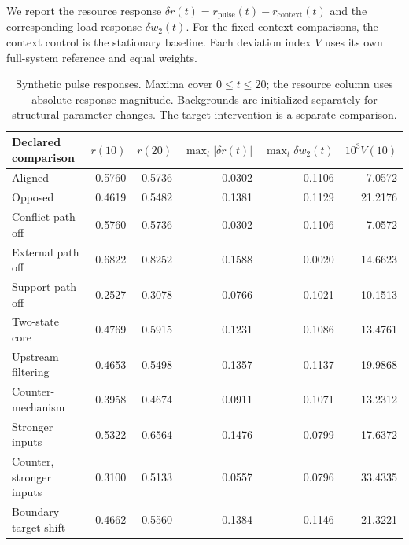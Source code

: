 We report the resource response $\delta r(t)=r_{\mathrm{pulse}}(t)-r_{\mathrm{context}}(t)$ and the corresponding load response $\delta w_2(t)$. For the fixed-context comparisons, the context control is the stationary baseline. Each deviation index $V$ uses its own full-system reference and equal weights.

\begin{table}[H]\centering\footnotesize

\begin{tabularx}{\textwidth}{@{}Yrrrrr@{}}\toprule

Declared comparison & $r(10)$ & $r(20)$ & $\max_t|\delta r(t)|$ & $\max_t\delta w_2(t)$ & $10^3 V(10)$ \\\midrule

Aligned & 0.5760 & 0.5736 & 0.0302 & 0.1106 & 7.0572 \\

Opposed & 0.4619 & 0.5482 & 0.1381 & 0.1129 & 21.2176 \\

Conflict path off & 0.5760 & 0.5736 & 0.0302 & 0.1106 & 7.0572 \\

External path off & 0.6822 & 0.8252 & 0.1588 & 0.0020 & 14.6623 \\

Support path off & 0.2527 & 0.3078 & 0.0766 & 0.1021 & 10.1513 \\

Two-state core & 0.4769 & 0.5915 & 0.1231 & 0.1086 & 13.4761 \\

Upstream filtering & 0.4653 & 0.5498 & 0.1357 & 0.1137 & 19.9868 \\

Counter-mechanism & 0.3958 & 0.4674 & 0.0911 & 0.1071 & 13.2312 \\

Stronger inputs & 0.5322 & 0.6564 & 0.1476 & 0.0799 & 17.6372 \\

Counter, stronger inputs & 0.3100 & 0.5133 & 0.0557 & 0.0796 & 33.4335 \\

Boundary target shift & 0.4662 & 0.5560 & 0.1384 & 0.1146 & 21.3221 \\

\bottomrule\end{tabularx}

\caption{Synthetic pulse responses. Maxima cover $0\leq t\leq20$; the resource column uses absolute response magnitude. Backgrounds are initialized separately for structural parameter changes. The target intervention is a separate comparison.}\label{tab:synthetic-results}\end{table}

